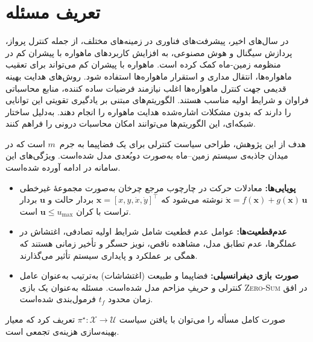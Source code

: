 \section{تعریف مسئله}\label{sec:problem_statement}
\noindent  در سال‌های اخیر، پیشرفت‌های فناوری در زمینه‌های مختلف، از جمله کنترل پرواز، پردازش سیگنال و هوش مصنوعی، به افزایش کاربردهای ماهواره با پیشران کم در منظومه زمین‐ماه کمک کرده است. ماهواره با پیشران کم می‌تواند برای تعقیب ماهواره‌ها، انتقال مداری و استقرار ماهواره‌ها استفاده شود.
روش‌های هدایت بهینه قدیمی جهت کنترل ماهواره‌ها اغلب نیازمند فرضیات ساده کننده، منابع محاسباتی فراوان و شرایط اولیه مناسب هستند. الگوریتم‌های مبتنی بر یادگیری تقویتی این توانایی را دارند که بدون مشکلات اشاره‌شده هدایت ماهواره را انجام دهند. به‌دلیل ساختار شبکه‌ای، این الگوریتم‌ها می‌توانند امکان محاسبات درونی  
را فراهم کنند.



هدف از این پژوهش، طراحی سیاست کنترلی برای یک فضاپیما به جرم~$m$ است که در میدان جاذبه‌ی سیستم زمین–ماه به‌صورت دوبُعدی مدل شده‌است. ویژگی‌های این سامانه در ادامه آورده شده‌است.

\begin{itemize}
	\item \textbf{پویایی‌ها:} معادلات حرکت در چارچوب مرجع چرخان به‌صورت مجموعهٔ غیرخطی {$\dot{\mathbf{x}} = f(\mathbf{x}) + g(\mathbf{x})\,\mathbf{u}$} نوشته می‌شود که $\mathbf{x}\!=\![x,y,\dot x,\dot y]^\top$ بردار حالت و $\mathbf{u}$ بردار تراست با کران $\mathbf{u}\le u_{\max}$ است.
	\item \textbf{عدم‌قطعیت‌ها:} 
عوامل عدم قطعیت شامل شرایط اولیه تصادفی، اغتشاش در عملگرها، عدم تطابق مدل، مشاهده ناقص، نویز حسگر و تأخیر زمانی هستند که همگی بر عملکرد و پایداری سیستم تأثیر می‌گذارند.
	
	\item \textbf{صورت بازی دیفرانسیلی:} فضاپیما و طبیعت (اغتشاشات) به‌ترتیب به‌عنوان عامل کنترلی و حریفِ مزاحم مدل شده‌است. مسئله به‌عنوان یک بازی \textsc{Zero-Sum} در افق زمان محدود {$t_f$} فرمول‌بندی شده‌است.
\end{itemize}

صورت کامل مسأله را می‌توان با یافتن سیاست {$\pi^\star : \mathcal{X}\to \mathcal{U}$} تعریف کرد که معیار بهینه‌سازی هزینه‌ی تجمعی است.

